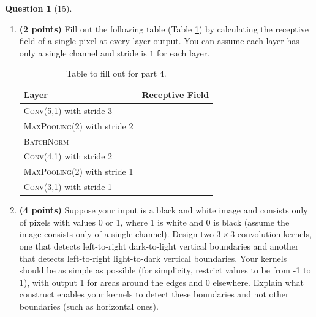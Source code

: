 \documentclass[12pt]{article}
\newif\ifsolution
\theoremstyle{definition}
\newtheorem{exercise}{Question}%
\newtheorem{answer}{Answer} %
\newcommand{\Answer}[1]{
\ifsolution\color{answer}\begin{answer}#1\end{answer}\fi
}
\newif\ifsolution
\begin{document}
\begin{exercise}[15]
{\begin{enumerate}
\item \textbf{(2 points)} Fill out the following table (Table \ref{tab:receptive-field-table}) by calculating the receptive field of a single pixel at every layer output. You can assume each layer has only a single channel and stride is $1$ for each layer.

\begin{table}[h]
    \centering
    \begin{tabular}{l|c}
    \toprule
    Layer & Receptive Field \\
    \midrule
    \textsc{Conv(5,1)} with stride 3 & \\
    \textsc{MaxPooling(2)} with stride 2 & \\
    \textsc{BatchNorm} & \\
    \textsc{Conv(4,1)} with stride 2 & \\
    \textsc{MaxPooling(2)} with stride 1 & \\
    \textsc{Conv(3,1)} with stride 1& \\
    \bottomrule
    \end{tabular}
    \caption{Table to fill out for part 4.}
    \label{tab:receptive-field-table}
\end{table}

\item \textbf{(4 points)} Suppose your input is a black and white image and consists only of pixels with values 0 or 1, where 1 is white and 0 is black (assume the image consists only of a single channel). Design two $3\times 3$ convolution kernels, one that detects left-to-right dark-to-light vertical boundaries and another that detects left-to-right light-to-dark vertical boundaries. Your kernels should be as simple as possible (for simplicity, restrict values to be from -1 to 1), with output 1 for areas around the edges and 0 elsewhere. Explain what construct enables your kernels to detect these boundaries and not other boundaries (such as horizontal ones).
\end{enumerate}
}

\Answer{
}

\end{exercise}
\end{document}
